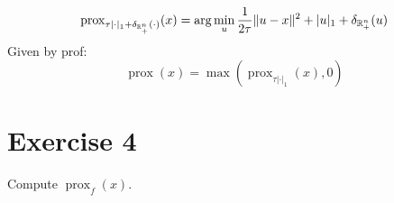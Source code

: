\documentclass[12pt]{article}
\begin{document}
\begin{equation}
  \operatorname{prox}_{\tau |\cdot|_1 + \delta_{\mathbb{R}_+^n} (\cdot)}(x) = \arg\min_{u} \frac{1}{2\tau}\|u-x\|^2 + |u|_1 + \delta_{\mathbb{R}_+^n} (u)
\end{equation}
Given by prof:
\begin{equation}
  \operatorname{prox}(x) = \max(\operatorname{prox}_{\tau |\cdot|_1}(x), 0)
\end{equation}


\section{Exercise 4}
Compute $\operatorname{prox}_{f}(x)$.


\end{document}
